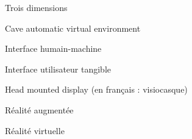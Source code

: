 \item [3D] Trois dimensions
\item [CAVE] Cave automatic virtual environment
\item [IHM] Interface humain-machine
\item [IUT] Interface utilisateur tangible
\item [HMD] Head mounted display (en français : visiocasque)
\item [RA] Réalité augmentée
\item [RV] Réalité virtuelle